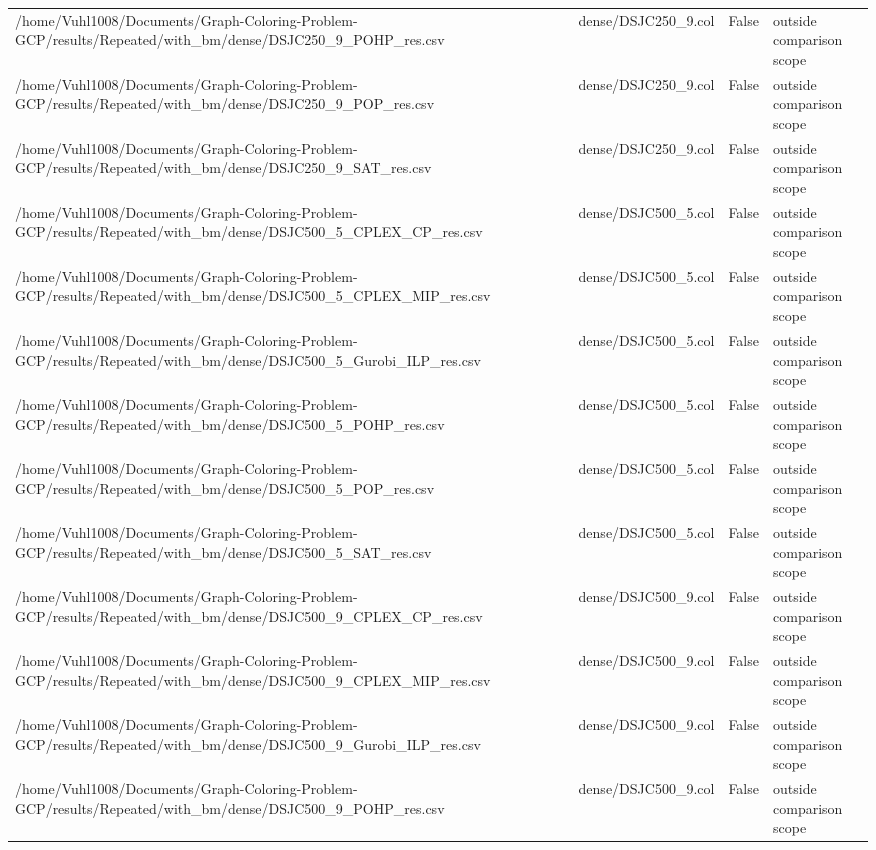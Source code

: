 \begin{table}[htbp]
\begin{tabular}{llll}
/home/Vuhl1008/Documents/Graph-Coloring-Problem-GCP/results/Repeated/with\_bm/dense/DSJC250\_9\_POHP\_res.csv & dense/DSJC250\_9.col & False & outside comparison scope \\
/home/Vuhl1008/Documents/Graph-Coloring-Problem-GCP/results/Repeated/with\_bm/dense/DSJC250\_9\_POP\_res.csv & dense/DSJC250\_9.col & False & outside comparison scope \\
/home/Vuhl1008/Documents/Graph-Coloring-Problem-GCP/results/Repeated/with\_bm/dense/DSJC250\_9\_SAT\_res.csv & dense/DSJC250\_9.col & False & outside comparison scope \\
/home/Vuhl1008/Documents/Graph-Coloring-Problem-GCP/results/Repeated/with\_bm/dense/DSJC500\_5\_CPLEX\_CP\_res.csv & dense/DSJC500\_5.col & False & outside comparison scope \\
/home/Vuhl1008/Documents/Graph-Coloring-Problem-GCP/results/Repeated/with\_bm/dense/DSJC500\_5\_CPLEX\_MIP\_res.csv & dense/DSJC500\_5.col & False & outside comparison scope \\
/home/Vuhl1008/Documents/Graph-Coloring-Problem-GCP/results/Repeated/with\_bm/dense/DSJC500\_5\_Gurobi\_ILP\_res.csv & dense/DSJC500\_5.col & False & outside comparison scope \\
/home/Vuhl1008/Documents/Graph-Coloring-Problem-GCP/results/Repeated/with\_bm/dense/DSJC500\_5\_POHP\_res.csv & dense/DSJC500\_5.col & False & outside comparison scope \\
/home/Vuhl1008/Documents/Graph-Coloring-Problem-GCP/results/Repeated/with\_bm/dense/DSJC500\_5\_POP\_res.csv & dense/DSJC500\_5.col & False & outside comparison scope \\
/home/Vuhl1008/Documents/Graph-Coloring-Problem-GCP/results/Repeated/with\_bm/dense/DSJC500\_5\_SAT\_res.csv & dense/DSJC500\_5.col & False & outside comparison scope \\
/home/Vuhl1008/Documents/Graph-Coloring-Problem-GCP/results/Repeated/with\_bm/dense/DSJC500\_9\_CPLEX\_CP\_res.csv & dense/DSJC500\_9.col & False & outside comparison scope \\
/home/Vuhl1008/Documents/Graph-Coloring-Problem-GCP/results/Repeated/with\_bm/dense/DSJC500\_9\_CPLEX\_MIP\_res.csv & dense/DSJC500\_9.col & False & outside comparison scope \\
/home/Vuhl1008/Documents/Graph-Coloring-Problem-GCP/results/Repeated/with\_bm/dense/DSJC500\_9\_Gurobi\_ILP\_res.csv & dense/DSJC500\_9.col & False & outside comparison scope \\
/home/Vuhl1008/Documents/Graph-Coloring-Problem-GCP/results/Repeated/with\_bm/dense/DSJC500\_9\_POHP\_res.csv & dense/DSJC500\_9.col & False & outside comparison scope \\

\end{tabular}
\end{table}
